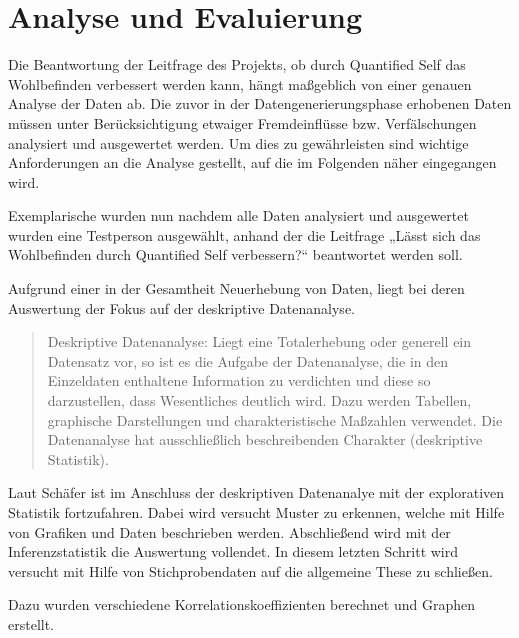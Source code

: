 
\chapter{Analyse und Evaluierung}
\label{ch:AnalyseUndEvaluierung}

Die Beantwortung der Leitfrage des Projekts, ob durch Quantified Self das Wohlbefinden verbessert werden kann, hängt maßgeblich von einer genauen Analyse der Daten ab. 
Die zuvor in der Datengenerierungsphase erhobenen Daten müssen unter Berücksichtigung etwaiger Fremdeinflüsse bzw. Verfälschungen analysiert und ausgewertet werden.
Um dies zu gewährleisten sind wichtige Anforderungen an die Analyse gestellt, auf die im Folgenden näher eingegangen wird.

Exemplarische wurden nun nachdem alle Daten analysiert und ausgewertet wurden eine Testperson ausgewählt, anhand der die Leitfrage „Lässt sich das Wohlbefinden durch Quantified Self verbessern?“ beantwortet werden soll.

Aufgrund einer in der Gesamtheit Neuerhebung von Daten, liegt bei deren Auswertung der Fokus auf der deskriptive Datenanalyse.

\begin{quote}
Deskriptive Datenanalyse: Liegt eine Totalerhebung oder generell ein Datensatz vor, so ist es die Aufgabe der Datenanalyse, die in den Einzeldaten enthaltene Information zu verdichten und diese so darzustellen, dass Wesentliches deutlich wird. Dazu werden Tabellen, graphische Darstellungen und charakteristische Maßzahlen verwendet.  Die Datenanalyse hat ausschließlich beschreibenden Charakter (deskriptive Statistik). 
\end{quote}
\cite{http://wirtschaftslexikon.gabler.de/Definition/datenanalyse.html?referenceKeywordName=statistische+Datenanalyse}


Laut Schäfer\cite{Schafer2010} ist im Anschluss der deskriptiven Datenanalye mit der explorativen Statistik fortzufahren.
Dabei wird versucht Muster zu erkennen, welche mit Hilfe von Grafiken und Daten beschrieben werden.
Abschließend wird mit der Inferenzstatistik die Auswertung vollendet.
In diesem letzten Schritt wird versucht mit Hilfe von Stichprobendaten auf die allgemeine These zu schließen.

Dazu wurden verschiedene Korrelationskoeffizienten berechnet und Graphen erstellt.


